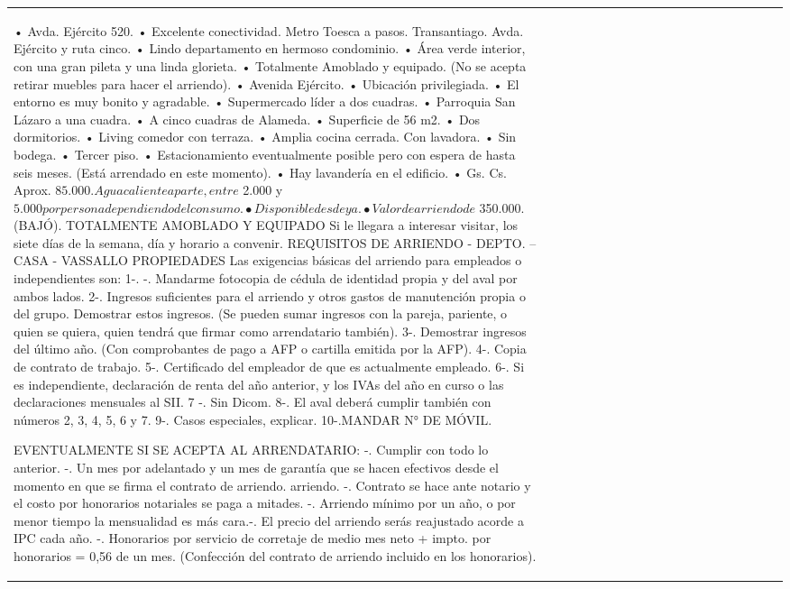 \begin{table}[H]
\begin{tabular}{llllllllllrrrrllllrr}
•	Avda. Ejército 520.
•	Excelente conectividad. Metro Toesca a pasos. Transantiago.
Avda. Ejército y ruta cinco.
•	Lindo departamento en hermoso condominio.
•	Área verde interior, con una gran pileta y una linda glorieta.
•	Totalmente Amoblado y equipado. (No se acepta retirar muebles para hacer el arriendo).
•	Avenida  Ejército.
•	Ubicación privilegiada.
•	El entorno es muy bonito y agradable.
•	Supermercado líder a dos cuadras.
•	Parroquia San Lázaro a una cuadra.
•	A cinco cuadras de Alameda.
•	Superficie de 56 m2.
•	Dos dormitorios.
•	Living comedor con terraza.
•	Amplia cocina cerrada. Con lavadora.
•	Sin bodega. 
•	Tercer piso.
•	Estacionamiento eventualmente posible pero con espera de hasta seis meses. (Está arrendado en este momento).
•	Hay lavandería en el edificio.
•	Gs. Cs. Aprox. $ 85.000. Agua caliente aparte, entre $ 2.000 y $ 5.000 por persona dependiendo del consumo.
•	Disponible desde ya.
•	Valor de arriendo de $ 350.000. (BAJÓ).
TOTALMENTE AMOBLADO Y EQUIPADO
Si le llegara a interesar visitar, los siete días de la semana, día y horario a convenir.
REQUISITOS DE ARRIENDO - DEPTO. – CASA - VASSALLO PROPIEDADES
Las exigencias básicas del arriendo para empleados o independientes son:
1-. -. Mandarme  fotocopia de cédula de identidad propia y del aval por ambos 
lados.
2-. Ingresos suficientes para el arriendo y otros gastos de manutención propia o del grupo. Demostrar estos ingresos.
(Se pueden sumar ingresos con la pareja, pariente, o quien se quiera, quien tendrá que firmar como arrendatario también). 
3-. Demostrar ingresos del último año. (Con comprobantes de pago  a AFP o cartilla emitida por la AFP).
4-. Copia de contrato de trabajo.
5-. Certificado del empleador de que es actualmente empleado.
6-. Si es independiente, declaración de renta del año anterior, y los IVAs del año en curso o las declaraciones mensuales al SII.
7 -. Sin Dicom.
8-.  El aval deberá cumplir también con números 2, 3, 4, 5, 6 y 7.
9-. Casos especiales, explicar.
10-.MANDAR N° DE MÓVIL. 

EVENTUALMENTE SI SE ACEPTA AL ARRENDATARIO:
-. Cumplir con todo lo anterior. 
-. Un  mes por adelantado y un mes de garantía que se hacen efectivos desde el momento en que se firma el contrato de arriendo.
arriendo.
-. Contrato se hace ante  notario y el costo por honorarios notariales se paga a mitades.
-. Arriendo mínimo por un año, o por menor tiempo la mensualidad es más cara.-. El precio del arriendo serás reajustado acorde a IPC cada año.
-. Honorarios por servicio de corretaje de medio mes neto + impto. por honorarios = 0,56 de un mes.
(Confección del contrato de arriendo incluido en los honorarios).


\end{tabular}
\end{table}
